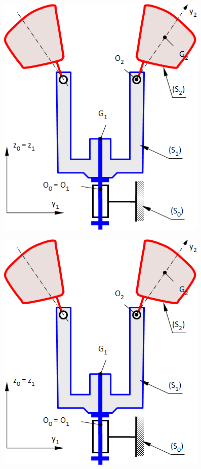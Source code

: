 \documentclass[10pt,fleqn]{article} %
\begin{document}
\begin{multicols}{2}
\ifprof
\begin{center}
\includegraphics[width=.5\linewidth]{images/fig_02}
\end{center}
\else
\begin{center}
\includegraphics[width=\linewidth]{images/fig_02}
\end{center}
\fi


\end{multicols}
\end{document}
